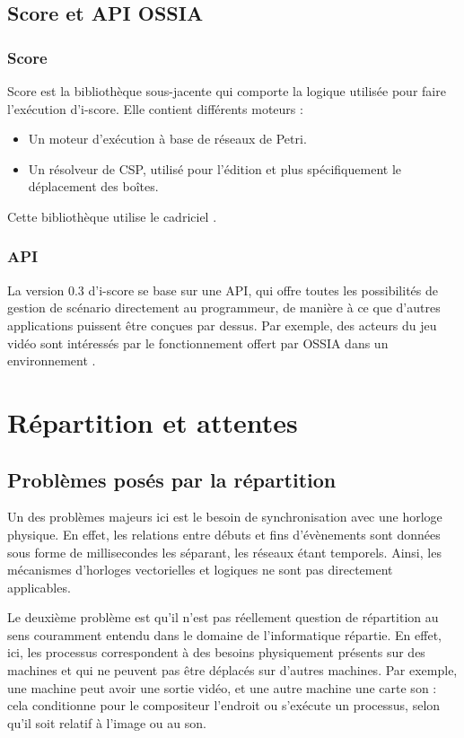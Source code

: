 \subsection{Score et API OSSIA}
\subsubsection{Score}
Score est la bibliothèque sous-jacente qui comporte la logique utilisée pour faire l'exécution d'i-score. Elle contient différents moteurs :

\begin{itemize}
	\item Un moteur d'exécution à base de réseaux de Petri.
	\item Un résolveur de \ac{CSP}, utilisé pour l'édition et plus spécifiquement le déplacement des boîtes.
\end{itemize}

Cette bibliothèque utilise le cadriciel .

\subsubsection{API}
La version 0.3 d'i-score se base sur une \ac{API}, qui offre toutes les possibilités de gestion de scénario directement au programmeur, de manière à ce que d'autres applications puissent être conçues par dessus. Par exemple, des acteurs du jeu vidéo sont intéressés par le fonctionnement offert par \ac{OSSIA} dans un environnement . 

\section{Répartition et attentes}
\subsection{Problèmes posés par la répartition}
Un des problèmes majeurs ici est le besoin de synchronisation avec une horloge physique. En effet, les relations entre débuts et fins d'évènements sont données sous forme de millisecondes les séparant, les réseaux étant temporels. Ainsi, les mécanismes d'horloges vectorielles et logiques ne sont pas directement applicables.

Le deuxième problème est qu'il n'est pas réellement question de répartition au sens couramment entendu dans le domaine de l'informatique répartie. En effet, ici, les processus correspondent à des besoins physiquement présents sur des machines et qui ne peuvent pas être déplacés sur d'autres machines. Par exemple, une machine peut avoir une sortie vidéo, et une autre machine une carte son : cela conditionne pour le compositeur l'endroit ou s'exécute un processus, selon qu'il soit relatif à l'image ou au son.

